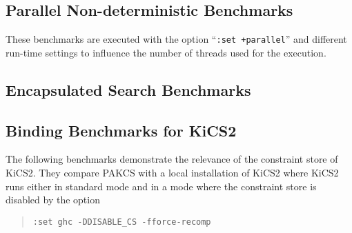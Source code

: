 \documentclass{scrartcl}
\begin{document}
\subsection{Parallel Non-deterministic Benchmarks}

These benchmarks are executed with the option ``\texttt{:set +parallel}''
and different run-time settings to influence the number
of threads used for the execution.

\begin{center}
\end{center}


\subsection{Encapsulated Search Benchmarks}

\begin{center}
\end{center}


\subsection{Binding Benchmarks for KiCS2}

The following benchmarks demonstrate the relevance of the
constraint store of KiCS2. They compare PAKCS with a local installation
of KiCS2 where KiCS2 runs either in standard mode and
in a mode where the constraint store is disabled by the option
\begin{quote}
\texttt{:set ghc -DDISABLE\_CS -fforce-recomp}
\end{quote}

\begin{center}
\end{center}
\end{document}
